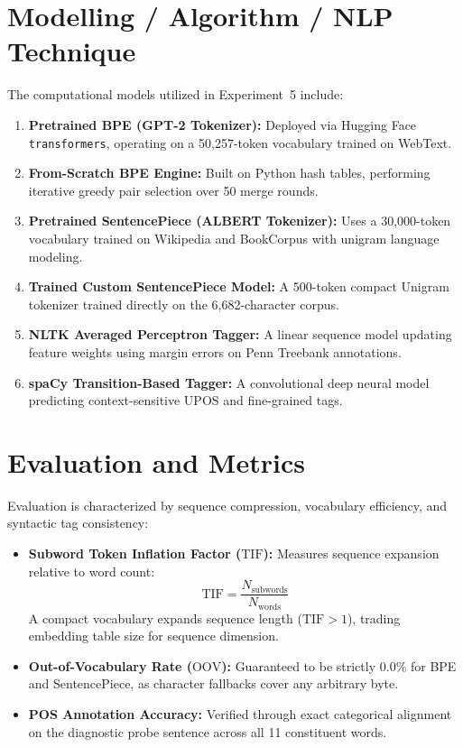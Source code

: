 \section{Modelling / Algorithm / NLP Technique}
The computational models utilized in Experiment~5 include:
\begin{enumerate}
    \item \textbf{Pretrained BPE (GPT-2 Tokenizer):} Deployed via Hugging Face \texttt{transformers}, operating on a 50,257-token vocabulary trained on WebText.
    \item \textbf{From-Scratch BPE Engine:} Built on Python hash tables, performing iterative greedy pair selection over 50 merge rounds.
    \item \textbf{Pretrained SentencePiece (ALBERT Tokenizer):} Uses a 30,000-token vocabulary trained on Wikipedia and BookCorpus with unigram language modeling.
    \item \textbf{Trained Custom SentencePiece Model:} A 500-token compact Unigram tokenizer trained directly on the 6,682-character corpus.
    \item \textbf{NLTK Averaged Perceptron Tagger:} A linear sequence model updating feature weights using margin errors on Penn Treebank annotations.
    \item \textbf{spaCy Transition-Based Tagger:} A convolutional deep neural model predicting context-sensitive UPOS and fine-grained tags.
\end{enumerate}

\section{Evaluation and Metrics}
Evaluation is characterized by sequence compression, vocabulary efficiency, and syntactic tag consistency:
\begin{itemize}
    \item \textbf{Subword Token Inflation Factor ($\text{TIF}$):} Measures sequence expansion relative to word count:
    \begin{equation}
        \text{TIF} = \frac{N_{\text{subwords}}}{N_{\text{words}}}
    \end{equation}
    A compact vocabulary expands sequence length ($\text{TIF} > 1$), trading embedding table size for sequence dimension.
    \item \textbf{Out-of-Vocabulary Rate ($\text{OOV}$):} Guaranteed to be strictly $0.0\%$ for BPE and SentencePiece, as character fallbacks cover any arbitrary byte.
    \item \textbf{POS Annotation Accuracy:} Verified through exact categorical alignment on the diagnostic probe sentence across all 11 constituent words.
\end{itemize}

